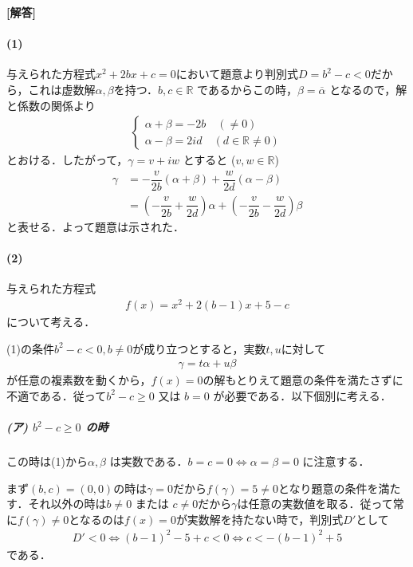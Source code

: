 \documentclass[../../main.tex]{subfiles}
\begin{document}
\begin{oframed}
  
\end{oframed}

{\bf [解答]}

\paragraph{(1)}

与えられた方程式$x^2+2bx+c=0$において題意より判別式$D=b^2-c<0$だから，これは虚数解$\alpha,\beta$を持つ．$b, c \in \mathbb{R}$ であるからこの時，$\beta = \overline{\alpha}$ となるので，解と係数の関係より
\begin{align}
  \begin{cases}
    \alpha + \beta = -2b \quad (\neq 0) \\
    \alpha - \beta = 2id \quad (d \in \mathbb{R} \neq 0)
  \end{cases}
\end{align}
とおける．したがって，$\gamma = v + iw$ とすると ($v, w \in \mathbb{R}$)
\begin{align}
  \gamma
  & = -\dfrac{v}{2b}(\alpha + \beta) + \dfrac{w}{2d}(\alpha - \beta)  \\
  & = \left( -\dfrac{v}{2b} + \dfrac{w}{2d} \right) \alpha + \left( -\dfrac{v}{2b} - \dfrac{w}{2d} \right) \beta
\end{align}
と表せる．よって題意は示された．

\paragraph{(2)}

与えられた方程式
\begin{align}
  f(x) = x^2 + 2(b-1)x + 5-c
\end{align}
について考える．

(1)の条件$b^2-c<0,b\neq 0$が成り立つとすると，実数$t,u$に対して
\begin{align}
  \gamma = t\alpha + u\beta
\end{align}
が任意の複素数を動くから，$f(x)=0$の解もとりえて題意の条件を満たさずに不適である．従って$b^2 - c \ge 0$ 又は $b = 0$ が必要である．以下個別に考える．

\subparagraph{(ア) $b^2 - c \ge 0$ の時}

この時は(1)から$\alpha, \beta$ は実数である．$b = c = 0 \iff \alpha = \beta = 0$ に注意する．

まず$(b,c)=(0,0)$の時は$\gamma=0$だから$f(\gamma)=5 \neq 0$となり題意の条件を満たす．それ以外の時は$b \neq 0$ または $c \neq 0$だから$\gamma$は任意の実数値を取る．従って常に$f(\gamma)\neq 0$となるのは$f(x)=0$が実数解を持たない時で，判別式$D'$として
\begin{align}
  D' < 0 \iff (b-1)^2 - 5 + c < 0 \iff c < -(b-1)^2 + 5 \label{eq:1}
\end{align}
である．
\end{document}

